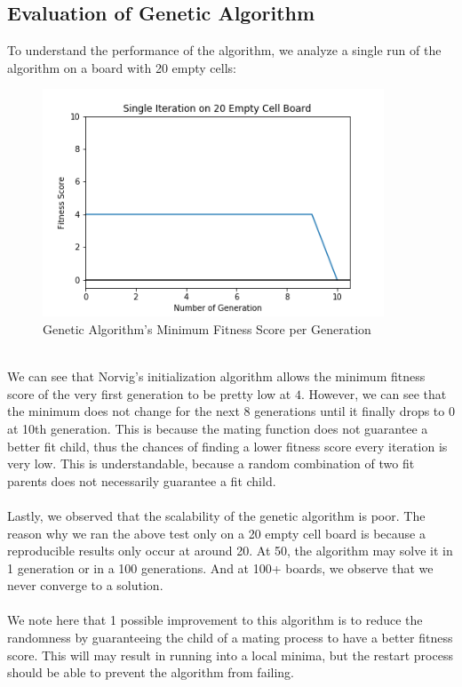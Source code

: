 \documentclass[12pt, a4paper]{article}
\begin{document}
			\subsection{Evaluation of Genetic Algorithm}
			To understand the performance of the algorithm, we analyze a single run of the algorithm on a board with 20 empty cells:
			\begin{figure}[h]
				\begin{center} 
					\includegraphics[width=4in]{genetic_algorithm_results.png}
					\caption{Genetic Algorithm's Minimum Fitness Score per Generation} 
					\label{fig:crossover}
				\end{center} 
			\end{figure}\\
			We can see that Norvig's initialization algorithm allows the minimum fitness score of the very first generation to be pretty low at $4$. However, we can see that the minimum does not change for the next 8 generations until it finally drops to $0$ at 10th generation. This is because the mating function does not guarantee a better fit child, thus the chances of finding a lower fitness score every iteration is very low. This is understandable, because a random combination of two fit parents does not necessarily guarantee a fit child.\\\\
			Lastly, we observed that the scalability of the genetic algorithm is poor. The reason why we ran the above test only on a 20 empty cell board is because a reproducible results only occur at around 20. At 50, the algorithm may solve it in 1 generation or in a 100 generations. And at 100+ boards, we observe that we never converge to a solution.\\\\
			We note here that 1 possible improvement to this algorithm is to reduce the randomness by guaranteeing the child of a mating process to have a better fitness score. This will may result in running into a local minima, but the restart process should be able to prevent the algorithm from failing.
\end{document}
